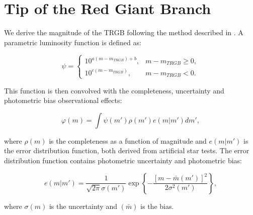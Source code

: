 \documentclass[12,manuscript,usenatbib]{aastex}
\begin{document}


\section{Tip of the Red Giant Branch}

We derive the magnitude of the TRGB following the method described in \citet{2006AJ....132.2729M}. A parametric luminosity function is defined as:

\begin{equation}
 \psi = \left\{ \begin{array}{lr}
                 10^{a(m-m_{TRGB})+b}, & m - m_{TRGB} \ge 0, \\
                 10^{c(m-m_{TRGB})},   & m - m_{TRGB} < 0.
                \end{array} \right.
\end{equation}

This  function is then convolved with the completeness, uncertainty and photometric bias observational effects:

\begin{equation}
 \varphi(m) = \int \psi(m') \rho(m') e(m|m')dm',
\end{equation}

where $\rho(m)$ is the completeness as a function of magnitude and $e(m|m')$ is the error distribution function, both derived from artificial star tests. The error distribution function contains photometric uncertainty and photometric bias:

\begin{equation}
e(m|m') = \frac{1}{\sqrt{2\pi}\sigma(m')} \exp \left\{ - \frac{[m - \bar{m}(m')]^2}{2\sigma^2(m')} \right\},
\end{equation}

where $\sigma(m)$ is the uncertainty and $(\bar m)$ is the bias. 
\end{document}
